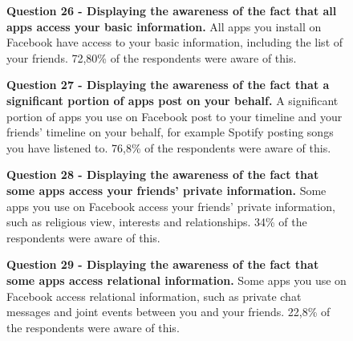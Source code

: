 \begin{figure}[h!]
\centering
{}
\caption[Question 26 - Displaying the awareness of the fact that all apps access your basic information]{\textbf{Question 26 - Displaying the awareness of the fact that all apps access your basic information.} All apps you install on Facebook have access to your basic information, including the list of your friends. 72,80\% of the respondents were aware of this.} 
\label{fig:appsaccessbasicinfo}
\end{figure}

\begin{figure}[h!]
\centering
{}
\caption[Question 27 - Displaying the awareness of the fact that a significant portion of apps post on your behalf]{\textbf{Question 27 - Displaying the awareness of the fact that a significant portion of apps post on your behalf.} A significant portion of apps you use on Facebook post to your timeline and your friends' timeline on your behalf, for example Spotify posting songs you have listened to. 76,8\% of the respondents were aware of this.} 
\label{fig:appspostonyourbehalf}
\end{figure}

\begin{figure}[h!]
\centering
{}
\caption[Question 28 - Displaying the awareness of the fact that some apps access your friends' private information]{\textbf{Question 28 - Displaying the awareness of the fact that some apps access your friends' private information.} Some apps you use on Facebook access your friends' private information, such as religious view, interests and relationships. 34\% of the respondents were aware of this.} 
\label{fig:appsaccesstofriendsinfo}
\end{figure}

\begin{figure}[h!]
\centering
{}
\caption[Question 29 - Displaying the awareness of the fact that some apps access relational information]{\textbf{Question 29 - Displaying the awareness of the fact that some apps access relational information.} Some apps you use on Facebook access relational information, such as private chat messages and joint events between you and your friends. 22,8\% of the respondents were aware of this.} 
\label{fig:appsaccessrelationalinfo}
\end{figure}

